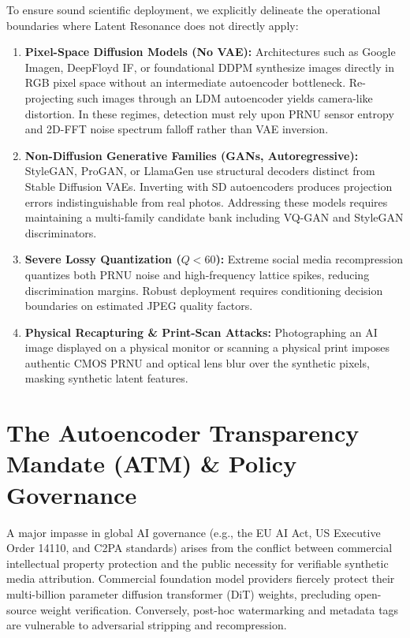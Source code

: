 \documentclass{article}
\theoremstyle{definition}
\begin{document}
To ensure sound scientific deployment, we explicitly delineate the operational boundaries where Latent Resonance does not directly apply:
\begin{enumerate}
    \item \textbf{Pixel-Space Diffusion Models (No VAE):} Architectures such as Google Imagen, DeepFloyd IF, or foundational DDPM synthesize images directly in RGB pixel space without an intermediate autoencoder bottleneck. Re-projecting such images through an LDM autoencoder yields camera-like distortion. In these regimes, detection must rely upon PRNU sensor entropy and 2D-FFT noise spectrum falloff rather than VAE inversion.
    \item \textbf{Non-Diffusion Generative Families (GANs, Autoregressive):} StyleGAN, ProGAN, or LlamaGen use structural decoders distinct from Stable Diffusion VAEs. Inverting with SD autoencoders produces projection errors indistinguishable from real photos. Addressing these models requires maintaining a multi-family candidate bank including VQ-GAN and StyleGAN discriminators.
    \item \textbf{Severe Lossy Quantization ($Q < 60$):} Extreme social media recompression quantizes both PRNU noise and high-frequency lattice spikes, reducing discrimination margins. Robust deployment requires conditioning decision boundaries on estimated JPEG quality factors.
    \item \textbf{Physical Recapturing \& Print-Scan Attacks:} Photographing an AI image displayed on a physical monitor or scanning a physical print imposes authentic CMOS PRNU and optical lens blur over the synthetic pixels, masking synthetic latent features.
\end{enumerate}

\section{The Autoencoder Transparency Mandate (ATM) \& Policy Governance}
\label{sec:atm}

A major impasse in global AI governance (e.g., the EU AI Act, US Executive Order 14110, and C2PA standards) arises from the conflict between commercial intellectual property protection and the public necessity for verifiable synthetic media attribution. Commercial foundation model providers fiercely protect their multi-billion parameter diffusion transformer (DiT) weights, precluding open-source weight verification. Conversely, post-hoc watermarking and metadata tags are vulnerable to adversarial stripping and recompression.
\end{document}
